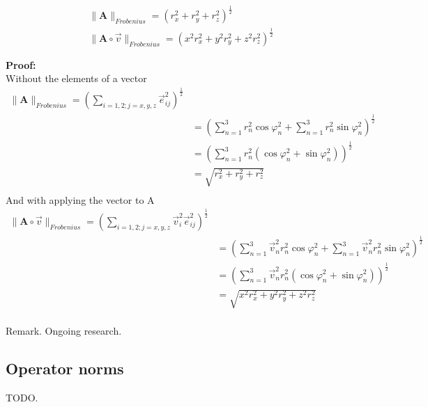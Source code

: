 \documentclass[a4paper]{article}
\begin{document}
\begin{Example}
\begin{PropositionMatrixNorm}
\begin{displaymath}
\begin{align}
\|\boldsymbol{A}\|_{Frobenius} = (r_{x}^{2}+r_{y}^{2}+r_{z}^{2})^{\frac{1}{2}}\\
\|\boldsymbol{A}\circ\vec{v}\|_{Frobenius} = (x^{2}r_{x}^{2}+y^{2}r_{y}^{2}+z^{2}r_{z}^{2})^{\frac{1}{2}}
\end{align}
\end{displaymath}
\end{PropositionMatrixNorm}

\textbf{Proof:}\\
Without the elements of a vector 
\begin{displaymath}
\begin{align}
\|\boldsymbol{A}\|_{Frobenius} = (\sum_{i=1,2;j=x,y,z}\vec{e}_{ij}^{2})^{\frac{1}{2}} \\
&= (\sum_{n=1}^{3}r_{n}^{2}\cos\varphi_n^{2} + \sum_{n=1}^{3}r_{n}^{2}\sin\varphi_n^{2})^{\frac{1}{2}}\\
&= (\sum_{n=1}^{3}r_{n}^{2}(\cos\varphi_n^{2} + \sin\varphi_n^{2}))^{\frac{1}{2}}\\
&= \sqrt{r_{x}^{2}+r_{y}^{2}+r_{z}^{2}}\\
\end{align}
\end{displaymath}
And with applying the vector to A
\begin{displaymath}
\begin{align}
\|\boldsymbol{A}\circ\vec{v}\|_{Frobenius} = (\sum_{i=1,2;j=x,y,z}\vec{v}_{i}^{2}\vec{e}_{ij}^{2})^{\frac{1}{2}} \\
&= (\sum_{n=1}^{3}\vec{v}_{n}^{2}r_{n}^{2}\cos\varphi_n^{2} + \sum_{n=1}^{3}\vec{v}_{n}^{2}r_{n}^{2}\sin\varphi_n^{2})^{\frac{1}{2}}\\
&= (\sum_{n=1}^{3}\vec{v}_{n}^{2}r_{n}^{2}(\cos\varphi_n^{2} + \sin\varphi_n^{2}))^{\frac{1}{2}}\\
&= \sqrt{x^{2}r_{x}^{2}+y^{2}r_{y}^{2}+z^{2}r_{z}^{2}}\\
\end{align}
\end{displaymath}

Remark. Ongoing research.



\subsection{Operator norms}

TODO.


\end{Example}
\end{document}
